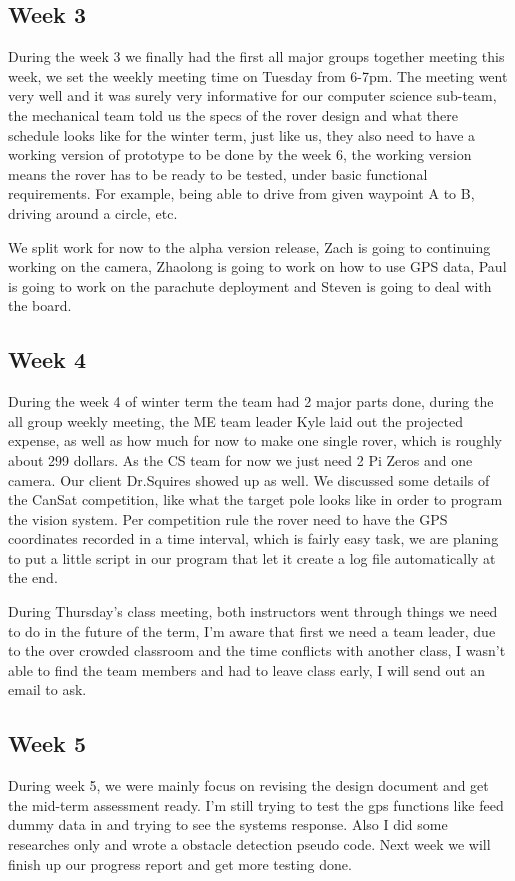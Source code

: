 \documentclass[10pt,letterpaper,onecolumn,draftclsnofoot,journal]{IEEEtran}
\begin{document}
\subsection{Week 3}
During the week 3 we finally had the first all major groups together meeting this week, we set the weekly meeting time on Tuesday from 6-7pm. The meeting went very well and it was surely very informative for our computer science sub-team, the mechanical team told us the specs of the rover design and what there schedule looks like for the winter term, just like us, they also need to have a working version of prototype to be done by the week 6, the working version means the rover has to be ready to be tested, under basic functional requirements. For example, being able to drive from given waypoint A to B, driving around a circle, etc.

We split work for now to the alpha version release, Zach is going to continuing working on the camera, Zhaolong is going to work on how to use GPS data, Paul is going to work on the parachute deployment and Steven is going to deal with the board.

\subsection{Week 4}
During the week 4 of winter term the team had 2 major parts done, during the all group weekly meeting, the ME team leader Kyle laid out the projected expense, as well as how much for now to make one single rover, which is roughly about 299 dollars. As the CS team for now we just need 2 Pi Zeros and one camera. Our client Dr.Squires showed up as well. We discussed some details of the CanSat competition, like what the target pole looks like in order to program the vision system. Per competition rule the rover need to have the GPS coordinates recorded in a time interval, which is fairly easy task, we are planing to put a little script in our program that let it create a log file automatically at the end.

During Thursday's class meeting, both instructors went through things we need to do in the future of the term, I'm aware that first we need a team leader, due to the over crowded classroom and the time conflicts with another class, I wasn't able to find the team members and had to leave class early, I will send out an email to ask.

\subsection{Week 5}
During week 5, we were mainly focus on revising the design document and get the mid-term assessment ready. I'm still trying to test the gps functions like feed dummy data in and trying to see the systems response. Also I did some researches only and wrote a obstacle detection pseudo code. Next week we will finish up our progress report and get more testing done.




%
%
\end{document}
